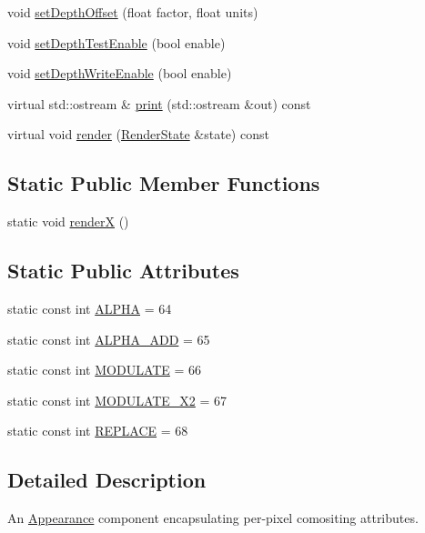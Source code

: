 \begin{CompactItemize}
\item 
void \hyperlink{classm3g_1_1CompositingMode_4c825055ad0b5910ef4f9136d9a8e588}{setDepthOffset} (float factor, float units)
\item 
void \hyperlink{classm3g_1_1CompositingMode_5f1afccdc51665bb04c971579d8ee05c}{setDepthTestEnable} (bool enable)
\item 
void \hyperlink{classm3g_1_1CompositingMode_a3275c9589ef319c6ba6f5c22d0b2860}{setDepthWriteEnable} (bool enable)
\item 
virtual std::ostream \& \hyperlink{classm3g_1_1CompositingMode_6fea17fa1532df3794f8cb39cb4f911f}{print} (std::ostream \&out) const 
\item 
virtual void \hyperlink{classm3g_1_1CompositingMode_8babc8a79b78615da51161e94029eea9}{render} (\hyperlink{structm3g_1_1RenderState}{RenderState} \&state) const 
\end{CompactItemize}
\subsection*{Static Public Member Functions}
\begin{CompactItemize}
\item 
static void \hyperlink{classm3g_1_1CompositingMode_443a7a301f77f625335ecc06d13bad06}{renderX} ()
\end{CompactItemize}
\subsection*{Static Public Attributes}
\begin{CompactItemize}
\item 
static const int \hyperlink{classm3g_1_1CompositingMode_417581fcde4067111f47320edb2aa378}{ALPHA} = 64
\item 
static const int \hyperlink{classm3g_1_1CompositingMode_91ac80a5450e5f7f7e382860829030d9}{ALPHA\_\-ADD} = 65
\item 
static const int \hyperlink{classm3g_1_1CompositingMode_96b64c2847348fb73a90c4a501cda9d1}{MODULATE} = 66
\item 
static const int \hyperlink{classm3g_1_1CompositingMode_cb426684e42a5ae425989c65fbb7dbc4}{MODULATE\_\-X2} = 67
\item 
static const int \hyperlink{classm3g_1_1CompositingMode_47a00ac5a59817a48db06fb2a538883c}{REPLACE} = 68
\end{CompactItemize}


\subsection{Detailed Description}
An \hyperlink{classm3g_1_1Appearance}{Appearance} component encapsulating per-pixel comositing attributes. 

